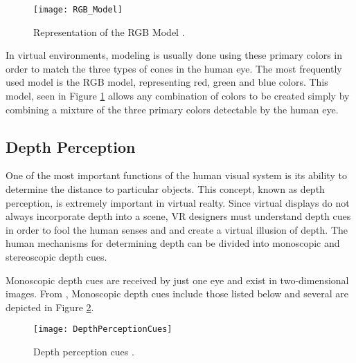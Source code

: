 \begin{figure}[h]
	\centering
	\texttt{[image: RGB\_Model]}
	\caption{Representation of the RGB Model \cite{_color}.}
	\label{fig:RGB_Model}
\end{figure}

\par In virtual environments, modeling is usually done using these primary colors in order to match the three types of cones in the human eye. The most frequently used model is the RGB model, representing red, green and blue colors. This model, seen in Figure \ref{fig:RGB_Model} allows any combination of colors to be created simply by combining a mixture of the three primary colors detectable by the human eye. 



\subsection{Depth Perception} \label{depth_perception} 


One of the most important functions of the human visual system is its ability to determine the distance to particular objects. This concept, known as depth perception, is extremely important in virtual realty. Since virtual displays do not always incorporate depth into a scene, VR designers must understand depth cues in order to fool the human senses and and create a virtual illusion of depth. The human mechanisms for determining depth can be divided into monoscopic and stereoscopic depth cues.

\par Monoscopic depth cues are received by just one eye and exist in two-dimensional images. From 
\cite{mihelj_apps}, Monoscopic depth cues include those listed below and several are depicted in Figure \ref{fig:depth}. 

\begin{figure}[h]
	\centering
	\texttt{[image: DepthPerceptionCues]}
	\caption{Depth perception cues \cite{depth}\cite{texture}\cite{filippini}\cite{LinearPerspective}.}
	\label{fig:depth}
\end{figure}

